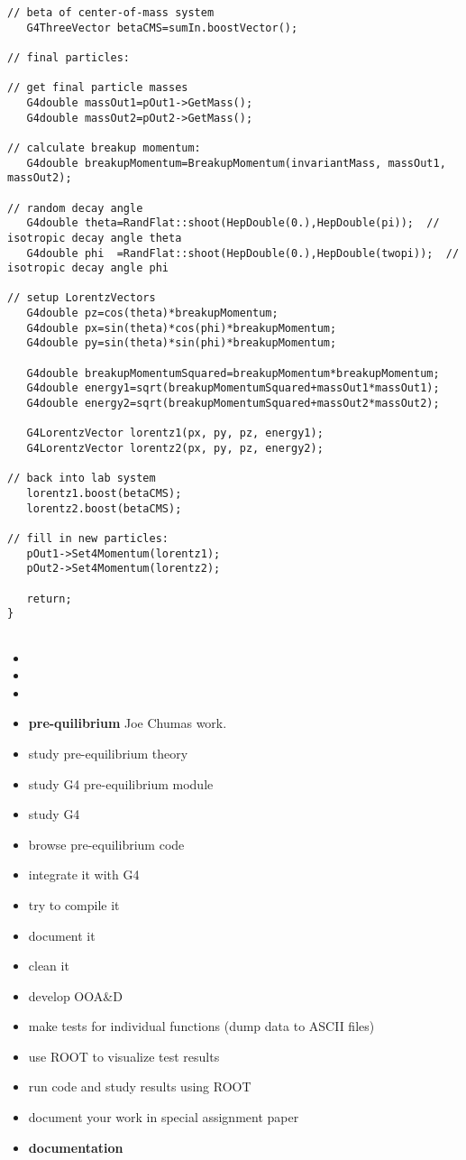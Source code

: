 \begin{verbatim}
// beta of center-of-mass system
   G4ThreeVector betaCMS=sumIn.boostVector();

// final particles:

// get final particle masses
   G4double massOut1=pOut1->GetMass();
   G4double massOut2=pOut2->GetMass();

// calculate breakup momentum:
   G4double breakupMomentum=BreakupMomentum(invariantMass, massOut1, massOut2);

// random decay angle
   G4double theta=RandFlat::shoot(HepDouble(0.),HepDouble(pi));  // isotropic decay angle theta
   G4double phi  =RandFlat::shoot(HepDouble(0.),HepDouble(twopi));  // isotropic decay angle phi

// setup LorentzVectors
   G4double pz=cos(theta)*breakupMomentum;
   G4double px=sin(theta)*cos(phi)*breakupMomentum;
   G4double py=sin(theta)*sin(phi)*breakupMomentum;
   
   G4double breakupMomentumSquared=breakupMomentum*breakupMomentum;
   G4double energy1=sqrt(breakupMomentumSquared+massOut1*massOut1);
   G4double energy2=sqrt(breakupMomentumSquared+massOut2*massOut2);

   G4LorentzVector lorentz1(px, py, pz, energy1);
   G4LorentzVector lorentz2(px, py, pz, energy2);

// back into lab system
   lorentz1.boost(betaCMS);
   lorentz2.boost(betaCMS);

// fill in new particles:
   pOut1->Set4Momentum(lorentz1);
   pOut2->Set4Momentum(lorentz2);

   return;
}
        
\end{verbatim}

\begin{itemize}
\item
\item
\item
\item {\bf pre-quilibrium} Joe Chumas work.

\end{itemize}

 
\begin{itemize}
\item study pre-equilibrium theory
\item study G4 pre-equilibrium module
\item study G4
\item browse pre-equilibrium code
\item integrate it with G4
\item try to compile it
\item document it
\item clean it
\item develop OOA\&D
\item make tests for individual functions (dump data to ASCII files)
\item use ROOT to visualize test results
\item run code and study results using ROOT
\item document your work in special assignment paper
\item {\bf documentation}
\end{itemize}



